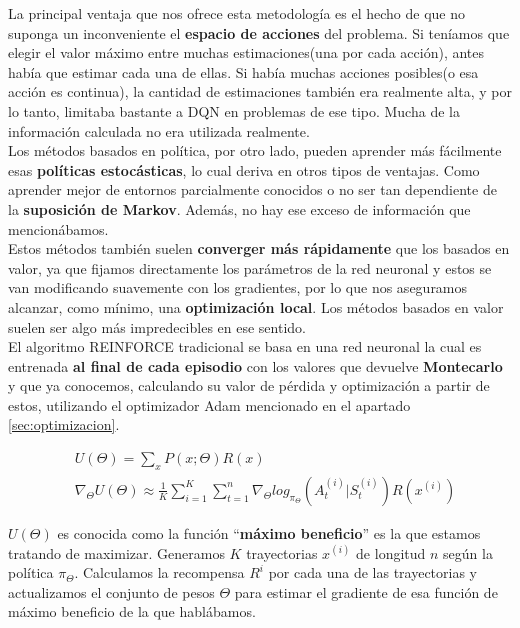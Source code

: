 \documentclass[11pt,fleqn]{book} %
\begin{document}
La principal ventaja que nos ofrece esta metodología es el hecho de que no suponga un inconveniente el \textbf{espacio de acciones} del problema. Si teníamos que elegir el valor máximo entre muchas estimaciones(una por cada acción), antes había que estimar cada una de ellas. Si había muchas acciones posibles(o esa acción es continua), la cantidad de estimaciones también era realmente alta, y por lo tanto, limitaba bastante a DQN en problemas de ese tipo. Mucha de la información calculada no era utilizada realmente. \\

Los métodos basados en política, por otro lado, pueden aprender más fácilmente esas \textbf{políticas estocásticas}, lo cual deriva en otros tipos de ventajas. Como aprender mejor de entornos parcialmente conocidos o no ser tan dependiente de la \textbf{suposición de Markov}. Además, no hay ese exceso de información que mencionábamos. \\

Estos métodos también suelen \textbf{converger más rápidamente} que los basados en valor, ya que fijamos directamente los parámetros de la red neuronal y estos se van modificando suavemente con los gradientes, por lo que nos aseguramos alcanzar, como mínimo, una \textbf{optimización local}. Los métodos basados en valor suelen ser algo más impredecibles en ese sentido.\\

El algoritmo REINFORCE tradicional se basa en una red neuronal la cual es entrenada \textbf{al final de cada episodio} con los valores que devuelve \textbf{Montecarlo} y que ya conocemos, calculando su valor de pérdida y optimización a partir de estos, utilizando el optimizador Adam mencionado en el apartado \ref{sec:optimizacion}.

\begin{align*}
&U(\Theta)=\sum_xP(x;\Theta)R(x)\\
&\nabla_\Theta U(\Theta) \approx \frac{1}{K}\sum^K_{i=1}\sum^n_{t=1}\nabla_\Theta log_{\pi_\Theta}(A^{(i)}_t|S^{(i)}_t)R(x^{(i)})
\end{align*}

$U(\Theta)$ es conocida como la función ``\textbf{máximo beneficio}'' es la que estamos tratando de maximizar. Generamos $K$ trayectorias $x^{(i)}$ de longitud $n$ según la política $\pi_ \Theta$. Calculamos la recompensa $R^i$ por cada una de las trayectorias y actualizamos el conjunto de pesos $\Theta$ para estimar el gradiente de esa función de máximo beneficio de la que hablábamos. \\
\end{document}

